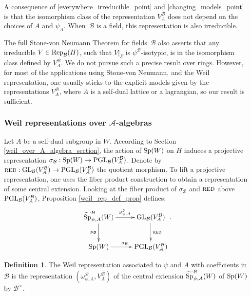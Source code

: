 \documentclass[11pt]{article}
\theoremstyle{plain}
\theoremstyle{definition}
\theoremstyle{plain}
\theoremstyle{definition}
\newtheorem*{defi_sans_num}{Definition}
\theoremstyle{plain}
\begin{document}
A consequence of \ref{everywhere_irreducible_point} and \ref{changing_models_point} is that the isomorphism class of the representation $V_A^\mathcal{B}$ does not depend on the choices of $A$ and $\psi_A$. When~$\mathcal{B}$ is a field, this representation is also irreducible.

The full Stone-von Neumann Theorem for fields~$\mathcal{B}$ also asserts that any irreducible $V \in \textup{Rep}_\mathcal{B}(H)$, such that $V|_F$ is $\psi^\mathcal{B}$-isotypic, is in the isomorphism class defined by $V_A^\mathcal{B}$. We do not pursue such a precise result over rings. However, for most of the applications using Stone-von Neumann, and the Weil representation, one usually sticks to the explicit models given by the representations $V_A^\mathcal{B}$, where $A$ is a self-dual lattice or a lagrangian, so our result is sufficient.

\subsubsection*{Weil representations over $\mathcal{A}$-algebras}

Let $A$ be a self-dual subgroup in $W$. According to Section \ref{weil_over_A_algebra_section}, the action of $\textup{Sp}(W)$ on $H$ induces a projective representation %
$\sigma_\mathcal{B} : \textup{Sp}(W) \to \textup{PGL}_\mathcal{B}(V_A^\mathcal{B})$. %
Denote by $\textsc{red} : \textup{GL}_\mathcal{B}(V_A^\mathcal{B}) \to \textup{PGL}_\mathcal{B}(V_A^\mathcal{B})$ the quotient morphism. To lift a projective representation, one uses the fiber product construction to obtain a representation of some central extension. Looking at the fiber product of $\sigma_\mathcal{B}$ and $\textsc{red}$ above $\textup{PGL}_\mathcal{B}(V_A^\mathcal{B})$, Proposition \ref{weil_rep_def_prop} defines:
$$\xymatrix{
		\widetilde{\textup{Sp}}_{\psi,A}^\mathcal{B}(W) \ar[r]^{\omega_{\psi,A}^\mathcal{B}} \ar[d]_{p_\mathcal{B}} & \textup{GL}_\mathcal{B}(V_A^\mathcal{B})  \ar[d]^{\textsc{red}} \\
		\textup{Sp}(W) \ar[r]^{\sigma_\mathcal{B}} & \textup{PGL}_\mathcal{B}(V_A^\mathcal{B})}.$$

\begin{defi_sans_num} The Weil representation associated to $\psi$ and $A$ with coefficients in $\mathcal{B}$ is the representation $(\omega_{\psi,A}^\mathcal{B},V_A^\mathcal{B})$ of the central extension $\widetilde{\textup{Sp}}_{\psi,A}^\mathcal{B}(W)$ of $\textup{Sp}(W)$ by $\mathcal{B}^\times$. \end{defi_sans_num}
\end{document}
